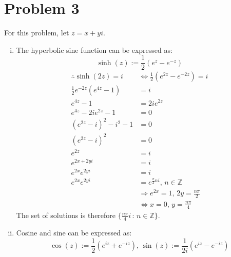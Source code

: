 \documentclass[a4paper, titlepage, DIV=14]{scrartcl}
\begin{document}
    \section*{Problem 3}
    For this problem, let $z=x + yi$.
    \begin{enumerate}[(i)]
        \item The hyperbolic sine function can be expressed as:
        \begin{equation*}
            \sinh(z) := \frac{1}{2}(e^{z}-e^{-z})
        \end{equation*}
        \begin{align*}
            \therefore \sinh(2z) = i &\Leftrightarrow \frac{1}{2}(e^{2z}-e^{-2z}) = i \\
            \frac{1}{2}e^{-2z}(e^{4z}-1) &= i \\
            e^{4z}-1 &= 2ie^{2z} \\
            e^{4z} - 2ie^{2z} -1 &= 0 \\
            (e^{2z} - i)^{2} -i^{2} -1 &= 0 \\
            (e^{2z} - i)^{2} &= 0 \\
            e^{2z} &= i \\
            e^{2x+2yi} &= i \\
            e^{2x}e^{2yi} &= i \\
            e^{2x}e^{2yi} &= e^{\frac{\pi}{2}ni}, \, n \in \mathbb{Z} \\
            &\Rightarrow e^{2x} = 1, \, 2y=\frac{n\pi}{2} \\
            &\Leftrightarrow x = 0, \, y = \frac{n\pi}{4}
        \end{align*}
        The set of solutions is therefore $\{\frac{n\pi}{4}i \, : \, n \in \mathbb{Z}\}$. \\

        \item Cosine and sine can be expressed as:
        \begin{equation*}
            \cos(z) := \frac{1}{2}(e^{iz}+e^{-iz}), \, \sin(z) := \frac{1}{2i}(e^{iz}-e^{-iz})
        \end{equation*}
        

\end{enumerate}
\end{document}
